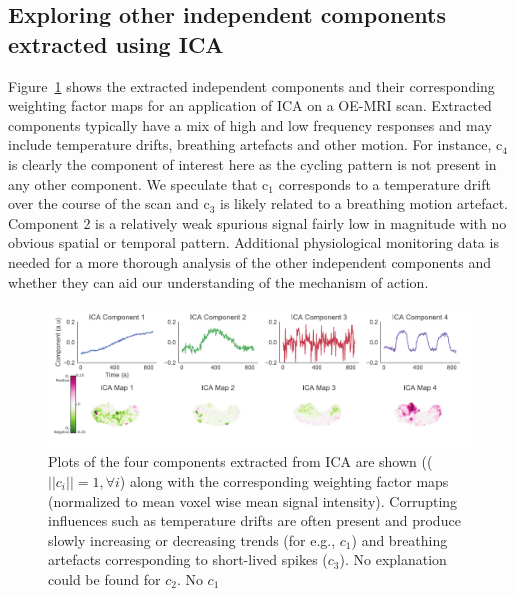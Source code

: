 \subsection{Exploring other independent components extracted using \acs{ICA}}
\label{res5}

Figure~\ref{Sfig_components} shows the extracted independent components and their corresponding weighting factor maps for an application of \acs{ICA} on a OE-MRI scan.
Extracted components typically have a mix of high and low frequency responses and may include temperature drifts, breathing artefacts and other motion. 
For instance, c$_4$ is clearly the component of interest here as the cycling pattern is not present in any other component. 
We speculate that c$_1$ corresponds to a temperature drift over the course of the scan and c$_3$ is likely related to a breathing motion artefact. 
Component 2 is a relatively weak spurious signal fairly low in magnitude with no obvious spatial or temporal pattern. 
Additional physiological monitoring data is needed for a more thorough analysis of the other independent components and whether they can aid our understanding of the mechanism of action.

\begin{figure}[htbp]
   \centering
   \includegraphics[width=\textwidth]{oemri_thesis1/oemri_thesis1-images/fig_components.pdf} %
   \caption{Plots of the four components extracted from \acs{ICA} are shown (($||c_i||=1, \forall i $) along with the corresponding  weighting factor maps (normalized to mean voxel wise mean signal intensity). Corrupting influences such as temperature drifts are often present and produce slowly increasing or decreasing trends (for e.g., $c_1$) and breathing artefacts corresponding to short-lived spikes ($c_3$). No explanation could be found for $c_2$.
No $c_1$
   \label{Sfig_components}}
\end{figure}

